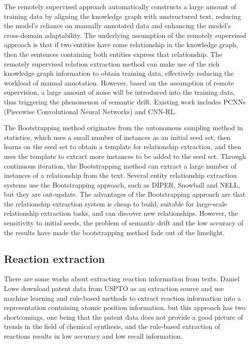 \documentclass[%
 aip,
 jmp,%
 amsmath,amssymb,
 reprint,%
]{revtex4-2}
\begin{document}
The remotely supervised approach automatically constructs a large amount of training data by 
aligning the knowledge graph with unstructured text, reducing the model's reliance on manually 
annotated data and enhancing the model's cross-domain adaptability. The underlying assumption 
of the remotely supervised approach is that if two entities have some relationship in the knowledge graph, 
then the sentences containing both entities express that relationship. The remotely supervised relation 
extraction method can make use of the rich knowledge graph information to obtain training data, 
effectively reducing the workload of manual annotation. However, based on the assumption of 
remote supervision, a large amount of noise will be introduced into the training data, 
thus triggering the phenomenon of semantic drift. Existing work includes PCNNs (Piecewise Convolutional Neural Networks) and
CNN-RL.

The Bootstrapping method originates from the autonomous sampling method in statistics, 
which uses a small number of instances as an initial seed set, then learns on the seed set 
to obtain a template for relationship extraction, and then uses the template to extract more instances 
to be added to the seed set. Through continuous iteration, the Bootstrapping method can extract 
a large number of instances of a relationship from the text. Several entity relationship extraction 
systems use the Bootstrapping approach, such as DIPER, Snowball and NELL, but they are out-update. 
The advantages of the Bootstrapping approach are that the relationship extraction system is cheap to build, 
suitable for large-scale relationship extraction tasks, and can discover new relationships. 
However, the sensitivity to initial seeds, the problem of semantic drift and the low accuracy of the 
results have made the bootstrapping method fade out of the limelight.

\subsection{Reaction extraction}
There are some works about extracting reaction information from texts.
Daniel Lowe download patent data from USPTO as an extraction source and use machine learning and rule-based 
methods to extract reaction information into a representation containing atomic position information, 
but this approach has two shortcomings, one being that the patent data does not provide a good picture 
of trends in the field of chemical synthesis, and the rule-based extraction of reactions results in 
low accuracy and low recall information.
\end{document}
